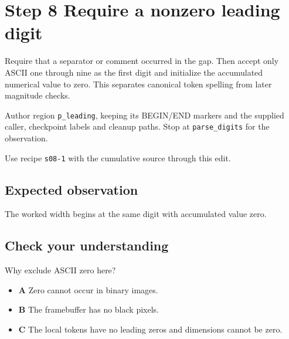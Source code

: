 \section{Step 8 Require a nonzero leading digit}\label{ppm-s08}

Require that a separator or comment occurred in the gap. Then accept only ASCII one through nine as the first digit and initialize the accumulated numerical value to zero. This separates canonical token spelling from later magnitude checks.

Author region \texttt{p\_leading}, keeping its BEGIN/END markers and the supplied caller, checkpoint labels and cleanup paths. Stop at \texttt{parse\_digits} for the observation.

Use recipe \texttt{s08-1} with the cumulative source through this edit.

\subsection{Expected observation}
The worked width begins at the same digit with accumulated value zero.

\subsection{Check your understanding}
Why exclude ASCII zero here?

\begin{itemize}
\item \textbf{A} Zero cannot occur in binary images.
\item \textbf{B} The framebuffer has no black pixels.
\item \textbf{C} The local tokens have no leading zeros and dimensions cannot be zero.
\end{itemize}
